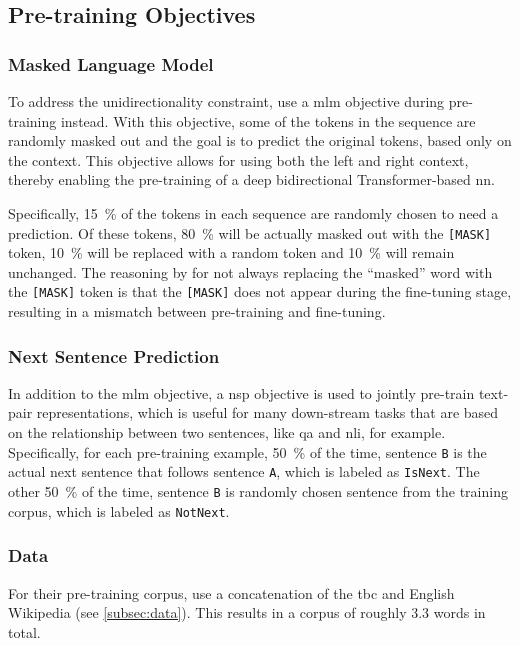 \subsection{Pre-training Objectives}
\subsubsection{Masked Language Model}
To address the unidirectionality constraint, \citet{devlin2018bert} use a \gls{mlm} objective during pre-training instead. With this objective, some of the tokens in the sequence are randomly masked out and the goal is to predict the original tokens, based only on the context. This objective allows for using both the left and right context, thereby enabling the pre-training of a deep bidirectional Transformer-based \gls{nn}. 

Specifically, \SI{15}{\percent} of the tokens in each sequence are randomly chosen to need a prediction. Of these tokens, \SI{80}{\percent} will be actually masked out with the \texttt{[MASK]} token, \SI{10}{\percent} will be replaced with a random token and \SI{10}{\percent} will remain unchanged. The reasoning by \citet{devlin2018bert} for not always replacing the ``masked'' word with the \texttt{[MASK]} token is that the \texttt{[MASK]} does not appear during the fine-tuning stage, resulting in a mismatch between pre-training and fine-tuning.

\subsubsection{Next Sentence Prediction}
In addition to the \gls{mlm} objective, a \gls{nsp} objective is used to jointly pre-train text-pair representations, which is useful for many down-stream tasks that are based on the relationship between two sentences, like \gls{qa} and \gls{nli}, for example. Specifically, for each pre-training example, \SI{50}{\percent} of the time, sentence \texttt{B} is the actual next sentence that follows sentence \texttt{A}, which is labeled as \texttt{IsNext}. The other \SI{50}{\percent} of the time, sentence \texttt{B} is randomly chosen sentence from the training corpus, which is labeled as \texttt{NotNext}.

\subsubsection{Data}
For their pre-training corpus, \citet{devlin2018bert} use a concatenation of the \gls{tbc} and English Wikipedia (see \cref{subsec:data}). This results in a corpus of roughly \SI{3.3}{\billion} words in total.


